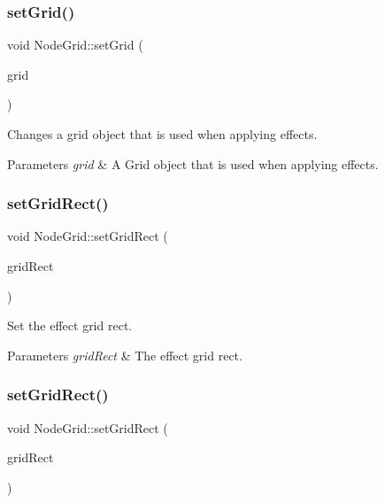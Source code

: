 \subsubsection{\texorpdfstring{set\+Grid()}{setGrid()}\hspace{0.1cm}{\footnotesize\ttfamily [2/2]}}
{\footnotesize\ttfamily void Node\+Grid\+::set\+Grid (\begin{DoxyParamCaption}\item[{\hyperlink{classGridBase}{Grid\+Base} $\ast$}]{grid }\end{DoxyParamCaption})}

Changes a grid object that is used when applying effects.


\begin{DoxyParams}{Parameters}
{\em grid} & A Grid object that is used when applying effects. \\
\hline
\end{DoxyParams}
\mbox{\label{classNodeGrid_adf29e6e9db43eaf8fd6156795e6e4286}} 
\subsubsection{\texorpdfstring{set\+Grid\+Rect()}{setGridRect()}\hspace{0.1cm}{\footnotesize\ttfamily [1/2]}}
{\footnotesize\ttfamily void Node\+Grid\+::set\+Grid\+Rect (\begin{DoxyParamCaption}\item[{const \hyperlink{classRect}{Rect} \&}]{grid\+Rect }\end{DoxyParamCaption})\hspace{0.3cm}{\ttfamily [inline]}}



Set the effect grid rect. 


\begin{DoxyParams}{Parameters}
{\em grid\+Rect} & The effect grid rect. \\
\hline
\end{DoxyParams}
\mbox{\label{classNodeGrid_adf29e6e9db43eaf8fd6156795e6e4286}} 
\subsubsection{\texorpdfstring{set\+Grid\+Rect()}{setGridRect()}\hspace{0.1cm}{\footnotesize\ttfamily [2/2]}}
{\footnotesize\ttfamily void Node\+Grid\+::set\+Grid\+Rect (\begin{DoxyParamCaption}\item[{const \hyperlink{classRect}{Rect} \&}]{grid\+Rect }\end{DoxyParamCaption})\hspace{0.3cm}{\ttfamily [inline]}}



